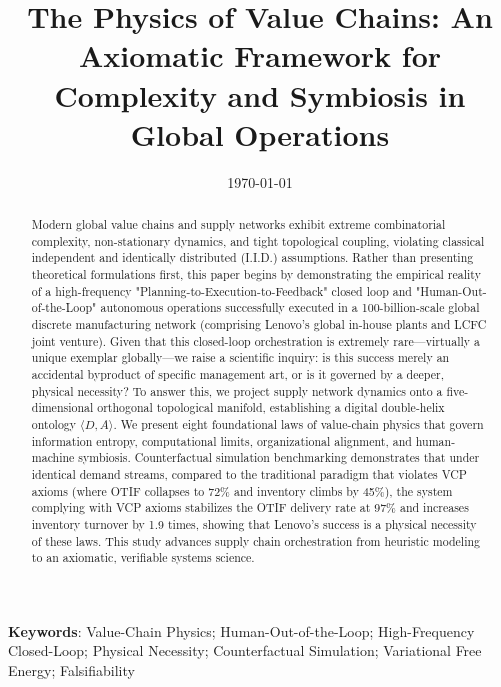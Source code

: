 \documentclass[11pt,a4paper]{article}
\title{\textbf{The Physics of Value Chains: An Axiomatic Framework for Complexity and Symbiosis in Global Operations}}
\author{}
\date{\today}
\begin{document}
\maketitle

\begin{abstract}
Modern global value chains and supply networks exhibit extreme combinatorial complexity, non-stationary dynamics, and tight topological coupling, violating classical independent and identically distributed (I.I.D.) assumptions. Rather than presenting theoretical formulations first, this paper begins by demonstrating the empirical reality of a high-frequency "Planning-to-Execution-to-Feedback" closed loop and "Human-Out-of-the-Loop" autonomous operations successfully executed in a 100-billion-scale global discrete manufacturing network (comprising Lenovo's global in-house plants and LCFC joint venture). Given that this closed-loop orchestration is extremely rare—virtually a unique exemplar globally—we raise a scientific inquiry: is this success merely an accidental byproduct of specific management art, or is it governed by a deeper, physical necessity? To answer this, we project supply network dynamics onto a five-dimensional orthogonal topological manifold, establishing a digital double-helix ontology $\langle D, A \rangle$. We present eight foundational laws of value-chain physics that govern information entropy, computational limits, organizational alignment, and human-machine symbiosis. Counterfactual simulation benchmarking demonstrates that under identical demand streams, compared to the traditional paradigm that violates VCP axioms (where OTIF collapses to 72\% and inventory climbs by 45\%), the system complying with VCP axioms stabilizes the OTIF delivery rate at 97\% and increases inventory turnover by 1.9 times, showing that Lenovo's success is a physical necessity of these laws. This study advances supply chain orchestration from heuristic modeling to an axiomatic, verifiable systems science.
\end{abstract}

\textbf{Keywords}: Value-Chain Physics; Human-Out-of-the-Loop; High-Frequency Closed-Loop; Physical Necessity; Counterfactual Simulation; Variational Free Energy; Falsifiability

\newpage
\end{document}
